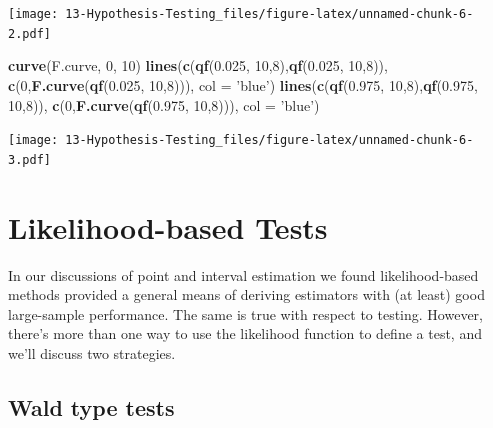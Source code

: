 \documentclass[]{book}
\newenvironment{Shaded}{\begin{snugshade}}{\end{snugshade}}
\newcommand{\KeywordTok}[1]{\textcolor[rgb]{0.13,0.29,0.53}{\textbf{{#1}}}}
\newcommand{\DataTypeTok}[1]{\textcolor[rgb]{0.13,0.29,0.53}{{#1}}}
\newcommand{\DecValTok}[1]{\textcolor[rgb]{0.00,0.00,0.81}{{#1}}}
\newcommand{\FloatTok}[1]{\textcolor[rgb]{0.00,0.00,0.81}{{#1}}}
\newcommand{\StringTok}[1]{\textcolor[rgb]{0.31,0.60,0.02}{{#1}}}
\newcommand{\NormalTok}[1]{{#1}}
\begin{document}
\texttt{[image: 13-Hypothesis-Testing\_files/figure-latex/unnamed-chunk-6-2.pdf]}

\begin{Shaded}
\begin{Highlighting}[]
\KeywordTok{curve}\NormalTok{(F.curve, }\DecValTok{0}\NormalTok{, }\DecValTok{10}\NormalTok{)}
\KeywordTok{lines}\NormalTok{(}\KeywordTok{c}\NormalTok{(}\KeywordTok{qf}\NormalTok{(}\FloatTok{0.025}\NormalTok{, }\DecValTok{10}\NormalTok{,}\DecValTok{8}\NormalTok{),}\KeywordTok{qf}\NormalTok{(}\FloatTok{0.025}\NormalTok{, }\DecValTok{10}\NormalTok{,}\DecValTok{8}\NormalTok{)), }\KeywordTok{c}\NormalTok{(}\DecValTok{0}\NormalTok{,}\KeywordTok{F.curve}\NormalTok{(}\KeywordTok{qf}\NormalTok{(}\FloatTok{0.025}\NormalTok{, }\DecValTok{10}\NormalTok{,}\DecValTok{8}\NormalTok{))), }\DataTypeTok{col =} \StringTok{'blue'}\NormalTok{)}
\KeywordTok{lines}\NormalTok{(}\KeywordTok{c}\NormalTok{(}\KeywordTok{qf}\NormalTok{(}\FloatTok{0.975}\NormalTok{, }\DecValTok{10}\NormalTok{,}\DecValTok{8}\NormalTok{),}\KeywordTok{qf}\NormalTok{(}\FloatTok{0.975}\NormalTok{, }\DecValTok{10}\NormalTok{,}\DecValTok{8}\NormalTok{)), }\KeywordTok{c}\NormalTok{(}\DecValTok{0}\NormalTok{,}\KeywordTok{F.curve}\NormalTok{(}\KeywordTok{qf}\NormalTok{(}\FloatTok{0.975}\NormalTok{, }\DecValTok{10}\NormalTok{,}\DecValTok{8}\NormalTok{))), }\DataTypeTok{col =} \StringTok{'blue'}\NormalTok{)}
\end{Highlighting}
\end{Shaded}

\texttt{[image: 13-Hypothesis-Testing\_files/figure-latex/unnamed-chunk-6-3.pdf]}

\section{Likelihood-based Tests}\label{likelihood-based-tests}

In our discussions of point and interval estimation we found
likelihood-based methods provided a general means of deriving estimators
with (at least) good large-sample performance. The same is true with
respect to testing. However, there's more than one way to use the
likelihood function to define a test, and we'll discuss two strategies.

\subsection{Wald type tests}\label{wald-type-tests}
\end{document}
